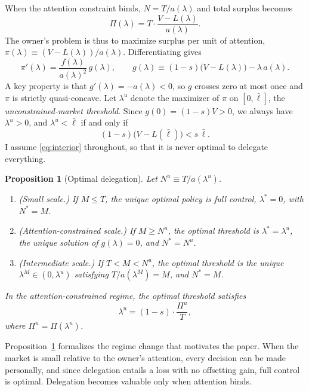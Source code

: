 \documentclass[11pt,a4paper]{article}
\theoremstyle{plain}
\newtheorem{proposition}{Proposition}
\newcommand{\lbar}{\bar{\ell}}
\begin{document}
When the attention constraint binds, $N = T / a(\lambda)$ and total surplus becomes
\begin{equation}\label{eq:Pi}
  \Pi(\lambda) = T \cdot \frac{V - L(\lambda)}{a(\lambda)}.
\end{equation}
The owner's problem is thus to maximize surplus per unit of attention, $\pi(\lambda) \equiv (V - L(\lambda)) / a(\lambda)$. Differentiating gives
\begin{equation}\label{eq:piprime}
  \pi'(\lambda) = \frac{f(\lambda)}{a(\lambda)^2} \, g(\lambda), \qquad g(\lambda) \equiv (1 - s)\big(V - L(\lambda)\big) - \lambda \, a(\lambda).
\end{equation}
A key property is that $g'(\lambda) = -a(\lambda) < 0$, so $g$ crosses zero at most once and $\pi$ is strictly quasi-concave. Let $\lambda^u$ denote the maximizer of $\pi$ on $[0, \lbar]$, the \emph{unconstrained-market threshold}. Since $g(0) = (1 - s)V > 0$, we always have $\lambda^u > 0$, and $\lambda^u < \lbar$ if and only if
\begin{equation}\label{eq:interior}
  (1 - s)\big(V - L(\lbar)\big) < s \, \lbar.
\end{equation}
I assume \eqref{eq:interior} throughout, so that it is never optimal to delegate everything.

\begin{proposition}[Optimal delegation]\label{prop:optimal}
Let $N^u \equiv T / a(\lambda^u)$.
\begin{enumerate}
  \item (Small scale.) If $M \le T$, the unique optimal policy is full control, $\lambda^* = 0$, with $N^* = M$.
  \item (Attention-constrained scale.) If $M \ge N^u$, the optimal threshold is $\lambda^* = \lambda^u$, the unique solution of $g(\lambda) = 0$, and $N^* = N^u$.
  \item (Intermediate scale.) If $T < M < N^u$, the optimal threshold is the unique $\lambda^M \in (0, \lambda^u)$ satisfying $T / a(\lambda^M) = M$, and $N^* = M$.
\end{enumerate}
In the attention-constrained regime, the optimal threshold satisfies
\begin{equation}\label{eq:threshold}
  \lambda^u = (1 - s) \cdot \frac{\Pi^u}{T},
\end{equation}
where $\Pi^u = \Pi(\lambda^u)$.
\end{proposition}

Proposition~\ref{prop:optimal} formalizes the regime change that motivates the paper. When the market is small relative to the owner's attention, every decision can be made personally, and since delegation entails a loss with no offsetting gain, full control is optimal. Delegation becomes valuable only when attention binds.
\end{document}
